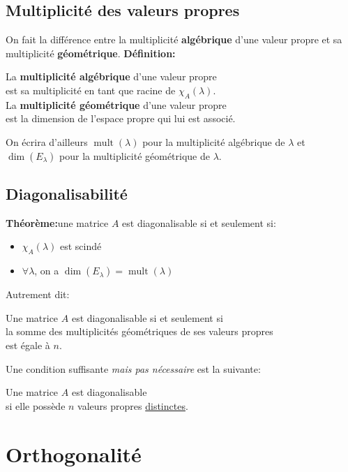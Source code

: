 \documentclass{article}
\newcommand\thm{\textbf{Théorème:}}
\DeclareMathOperator{\mult}{mult}
\begin{document}
\subsection{Multiplicité des valeurs propres}
On fait la différence entre la multiplicité \textbf{algébrique} d'une valeur propre et sa multiplicité \textbf{géométrique}.
\textbf{Définition:}
\begin{center}
	La \textbf{multiplicité algébrique} d'une valeur propre \\ est sa multiplicité en tant que racine de \(\chi_A(\lambda)\). \\ \vspace{10pt}
	La \textbf{multiplicité géométrique} d'une valeur propre \\ est la dimension de l'espace propre qui lui est associé.
\end{center}
On écrira d'ailleurs \(\mult(\lambda)\) pour la multiplicité algébrique de \(\lambda\) et \(\dim(E_\lambda)\) pour la multiplicité géométrique de \(\lambda\).

\subsection{Diagonalisabilité}
\thm une matrice \(A\) est diagonalisable si et seulement si:
\begin{itemize}
	\item \(\chi_A(\lambda)\) est scindé
	\item \(\forall \lambda\), on a \(\dim(E_\lambda) = \mult(\lambda)\)
\end{itemize}
Autrement dit:
\begin{center}
	Une matrice \(A\) est diagonalisable si et seulement si \\ la somme des multiplicités géométriques de ses valeurs propres \\ est égale à \(n\).
\end{center}
Une condition suffisante \emph{mais pas nécessaire} est la suivante:
\begin{center}
	Une matrice \(A\) est diagonalisable \\ si elle possède \(n\) valeurs propres \underline{distinctes}.
\end{center}

\section{Orthogonalité}
\end{document}
